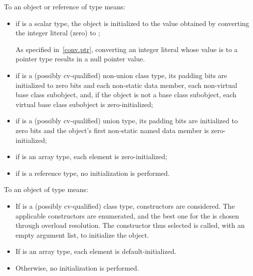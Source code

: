 \pnum
{}%
%
%
To
an object or reference of type
means:
\begin{itemize}
\item
if
is a scalar type, the
object
is initialized to the value obtained by converting the integer literal 
(zero) to
;
\begin{footnote}
As specified in~\ref{conv.ptr}, converting an integer
literal whose value is
to a pointer type results in a null pointer value.
\end{footnote}

\item
if
is a (possibly cv-qualified) non-union class type,
its padding bits are initialized to zero bits and
each non-static data member,
each non-virtual base class subobject, and,
if the object is not a base class subobject,
each virtual base class subobject
is zero-initialized;

\item
if
is a (possibly cv-qualified) union type,
its padding bits are initialized to zero bits and
the
object's first non-static named
data member
is zero-initialized;

\item
if
is an array type,
each element is zero-initialized;
\item
if
is a reference type, no initialization is performed.
\end{itemize}

\pnum
To
an object of type
means:

\begin{itemize}
\item
If
is a (possibly cv-qualified) class type,
constructors are considered. The applicable constructors are
enumerated, and the best one for the
 \tcode{()} is chosen through
overload resolution. The constructor thus selected
is called, with an empty argument list, to initialize the object.

\item
If
is an array type, each element is default-initialized.

\item
Otherwise,
no initialization is performed.
\end{itemize}

